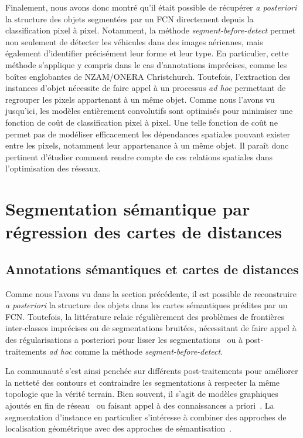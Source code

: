 Finalement, nous avons donc montré qu'il était possible de récupérer \emph{a posteriori} la structure des objets segmentées par un \gls{FCN} directement depuis la classification pixel à pixel. Notamment, la méthode \emph{segment-before-detect} permet non seulement de détecter les véhicules dans des images aériennes, mais également d'identifier précisément leur forme et leur type. En particulier, cette méthode s'applique y compris dans le cas d'annotations imprécises, comme les boîtes englobantes de NZAM/ONERA Christchurch.
Toutefois, l'extraction des instances d'objet nécessite de faire appel à un processus \emph{ad hoc} permettant de regrouper les pixels appartenant à un même objet. Comme nous l'avons vu jusqu'ici, les modèles entièrement convolutifs sont optimisés pour minimiser une fonction de coût de classification pixel à pixel. Une telle fonction de coût ne permet pas de modéliser efficacement les dépendances spatiales pouvant exister entre les pixels, notamment leur appartenance à un même objet. Il paraît donc pertinent d'étudier comment rendre compte de ces relations spatiales dans l'optimisation des réseaux.

\section{Segmentation sémantique par régression des cartes de distances}
\label{sec:cds}

\subsection{Annotations sémantiques et cartes de distances}

Comme nous l'avons vu dans la section précédente, il est possible de reconstruire \emph{a posteriori} la structure des objets dans les cartes sémantiques prédites par un \gls{FCN}. Toutefois, la littérature relaie régulièrement des problèmes de frontières inter-classes imprécises ou de segmentations bruitées, nécessitant de faire appel à des régularisations a posteriori pour lisser les segmentations~\cite{zheng_conditional_2015,chen_deeplab_2018} ou à post-traitements \emph{ad hoc} comme la méthode \emph{segment-before-detect}.

La communauté s'est ainsi penchée sur différents post-traitements pour améliorer la netteté des contours et contraindre les segmentations à respecter la même topologie que la vérité terrain. Bien souvent, il s'agit de modèles graphiques ajoutés en fin de réseau~\cite{liu_deep_2018} ou faisant appel à des connaissances a priori~\cite{le_reformulating_2018,bertasius_semantic_2016}. La segmentation d'instance en particulier s'intéresse à combiner des approches de localisation géométrique avec des approches de sémantisation~\cite{he_mask_2017,dai_instance-aware_2016}.

